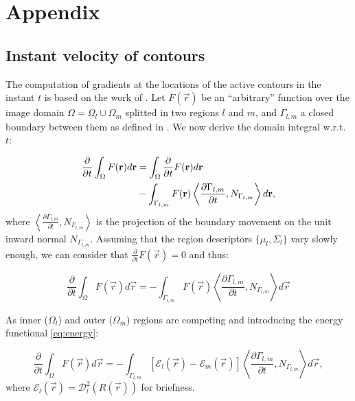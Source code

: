\renewcommand{\theequation}{A.\arabic{equation}}
\renewcommand{\thesubsection}{Appendix \arabic{subsection}}

\section*{Appendix}

\subsection{Instant velocity of contours}
\label{app:shape_priors}
The computation of gradients at the locations of the active contours in the
  instant $t$ is based on the work of \cite{herbulot_segmentation_2006}.
Let $F(\vec{r})$ be an ``arbitrary'' function over the image domain
  $\Omega = \Omega_l \cup \Omega_m$ splitted in two regions $l$ and
  $m$, and $\Gamma_{l,m}$ a closed boundary between them
  as defined in .
We now derive the domain integral w.r.t. $t$:

  \begin{align*}
  \frac{\partial}{\partial t} \int_\Omega F(\vec{r}) d\vec{r} &=
  \int_\Omega \frac{\partial}{\partial t}F(\vec{r}) d\vec{r} \notag\\
  &- \int_{\Gamma_{l,m}} F(\vec{r}) \left\langle \frac{\partial \Gamma_{l,m} }{\partial t},
  N_{\Gamma_{l,m}}\right\rangle d\vec{r},
  \end{align*}
%
  where $\left\langle\frac{\partial\Gamma_{l,m}}{\partial t}, N_{\Gamma_{l,m}}\right\rangle$ is
  the projection of the boundary movement on the unit inward normal $N_{\Gamma_{l,m}}$.
Assuming that the region descriptors $\{\mu_l, \Sigma_l\}$ vary slowly enough, we can consider
  that $\frac{\partial}{\partial t} F(\vec{r}) = 0$ and thus:

  \begin{equation*}
  \frac{\partial}{\partial t} \int_\Omega F(\vec{r}) d\vec{r} =
  - \int_{\Gamma_{l,m}} F(\vec{r}) \left\langle \frac{\partial \Gamma_{l,m} }{\partial t},
  N_{\Gamma_{l,m}}\right\rangle d\vec{r}
  \end{equation*}

  As inner ($\Omega_l$) and outer ($\Omega_m$) regions are competing and introducing
    the energy functional \eqref{eq:energy}:

    \begin{equation}
    \frac{\partial}{\partial t} \int_\Omega F(\vec{r}) d\vec{r} =
    - \int_{\Gamma_{l,m}} \left[ \mathcal{E}_{l}(\vec{r}) - \mathcal{E}_{m}(\vec{r}) \right]
    \left\langle \frac{\partial \Gamma_{l,m} }{\partial t},
  N_{\Gamma_{l,m}}\right\rangle d\vec{r},
  	\label{eq:shape_gradients}
    \end{equation}
%
    where $\mathcal{E}_l(\vec{r}) = \mathcal{D}^2_{l}(R(\vec{r}))$ for briefness.

